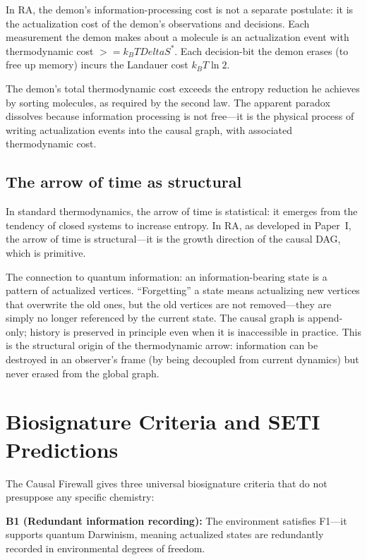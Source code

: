 \documentclass[11pt]{article}
\def\Delta{Delta}%
\def\geq{>=}%
\begin{document}
In RA, the demon's information-processing cost is not a separate postulate: it is the actualization cost of the demon's observations and decisions. Each measurement the demon makes about a molecule is an actualization event with thermodynamic cost $\geq k_B T \Delta S^*$. Each decision-bit the demon erases (to free up memory) incurs the Landauer cost $k_B T \ln 2$.

The demon's total thermodynamic cost exceeds the entropy reduction he achieves by sorting molecules, as required by the second law. The apparent paradox dissolves because information processing is not free---it is the physical process of writing actualization events into the causal graph, with associated thermodynamic cost.

\subsection{The arrow of time as structural}
\label{sec:qinfo_arrow}

In standard thermodynamics, the arrow of time is statistical: it emerges from the tendency of closed systems to increase entropy. In RA, as developed in Paper~I, the arrow of time is structural---it is the growth direction of the causal DAG, which is primitive.

The connection to quantum information: an information-bearing state is a pattern of actualized vertices. ``Forgetting'' a state means actualizing new vertices that overwrite the old ones, but the old vertices are not removed---they are simply no longer referenced by the current state. The causal graph is append-only; history is preserved in principle even when it is inaccessible in practice. This is the structural origin of the thermodynamic arrow: information can be destroyed in an observer's frame (by being decoupled from current dynamics) but never erased from the global graph.

\section{Biosignature Criteria and SETI Predictions}
\label{sec:seti}

The Causal Firewall gives three universal biosignature criteria that do not presuppose any specific chemistry:

\textbf{B1 (Redundant information recording):} The environment satisfies F1---it supports quantum Darwinism, meaning actualized states are redundantly recorded in environmental degrees of freedom.
\end{document}
